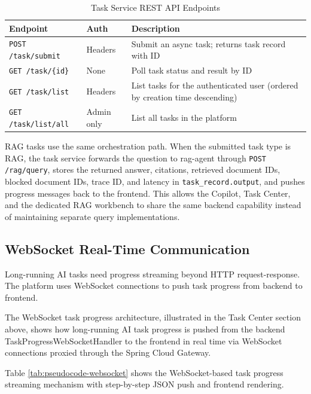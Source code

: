 \vspace{3mm}
\begin{table}[H]
\small\singlespacing
\centering
\caption{Task Service REST API Endpoints}
\label{tab:task-service-api}
\begin{tabularx}{\textwidth}{>{\RaggedRight\arraybackslash}p{}>{\RaggedRight\arraybackslash}p{}>{\RaggedRight\arraybackslash}X}
\toprule
\textbf{Endpoint} & \textbf{Auth} & \textbf{Description} \\
\midrule
\texttt{POST /task/submit} & Headers & Submit an async task; returns task record with ID \\
\texttt{GET /task/\{id\}} & None & Poll task status and result by ID \\
\texttt{GET /task/list} & Headers & List tasks for the authenticated user (ordered by creation time descending) \\
\texttt{GET /task/list/all} & Admin only & List all tasks in the platform \\
\bottomrule
\end{tabularx}
\end{table}

RAG tasks use the same orchestration path. When the submitted task type is RAG, the task service forwards the question to rag-agent through \texttt{POST /rag/query}, stores the returned answer, citations, retrieved document IDs, blocked document IDs, trace ID, and latency in \texttt{task\_record.output}, and pushes progress messages back to the frontend. This allows the Copilot, Task Center, and the dedicated RAG workbench to share the same backend capability instead of maintaining separate query implementations.

\subsection{WebSocket Real-Time Communication}

Long-running AI tasks need progress streaming beyond HTTP request-response. The platform uses WebSocket connections to push task progress from backend to frontend.

The WebSocket task progress architecture, illustrated in the Task Center section above, shows how long-running AI task progress is pushed from the backend TaskProgressWebSocketHandler to the frontend in real time via WebSocket connections proxied through the Spring Cloud Gateway.

Table \ref{tab:pseudocode-websocket} shows the WebSocket-based task progress streaming mechanism with step-by-step JSON push and frontend rendering.

